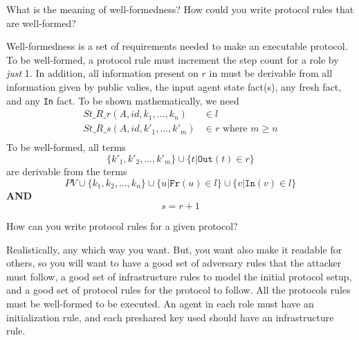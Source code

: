 \begin{questions}
\question{} What is the meaning of well-formedness? How could you write protocol rules that are well-formed?
  \begin{solution}
    Well-formedness is a set of requirements needed to make an executable protocol.
    To be well-formed, a protocol rule must increment the step count for a role by \emph{just} 1.
    In addition, all information present on $r$ in  must be derivable from all information given by public valies, the input agent state fact(s), any fresh fact, and any \texttt{In} fact.
    To be shown mathematically, we need
    \begin{align*}
      St\_R\_r(A, id, k_{1}, \ldots, k_{n}) &\in l \\
      St\_R\_s(A, id, k'_{1}, \ldots, k'_{m}) &\in r \text{ where } m \geq n \\
    \end{align*}
    To be well-formed, all terms
    \begin{equation*}
      \lbrace k'_{1}, k'_{2}, \ldots, k'_{m} \rbrace \cup \lbrace t \vert \mathtt{Out}(t) \in r \rbrace
    \end{equation*}
    are derivable from the terms
    \begin{equation*}
      PV \cup \lbrace k_{1}, k_{2}, \ldots, k_{n} \rbrace \cup \lbrace u \vert \mathtt{Fr}(u) \in l \rbrace \cup \lbrace v \vert \mathtt{In}(v) \in l \rbrace
    \end{equation*}
    \textbf{AND}
    \begin{equation*}
      s = r+1
    \end{equation*}
  \end{solution}

\question{} How can you write protocol rules for a given protocol?
  \begin{solution}
    Realistically, any which way you want.
    But, you want also make it readable for others, so you will want to have a good set of adversary rules that the attacker must follow, a good set of infrastructure rules to model the initial protocol setup, and a good set of protocol rules for the protocol to follow.
    All the protocols rules must be well-formed to be executed.
    An agent in each role must have an initialization rule, and each preshared key used should have an infrastructure rule.
  \end{solution}


\end{questions}
